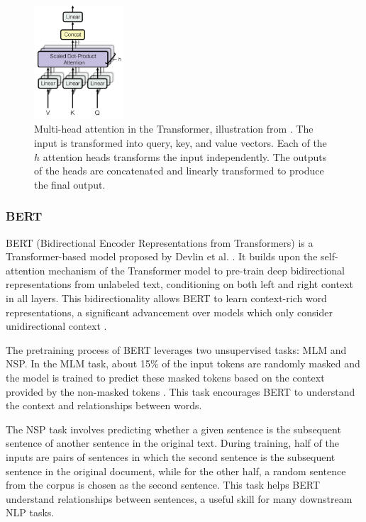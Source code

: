 \begin{figure}[ht]
    \centering
    \includegraphics[width=0.3\textwidth]{screenshots/multi_head_attention.png}
    \caption[Multi-Head Attention]{Multi-head attention in the Transformer, illustration from \cite{VaswaniAttentionAll2017}.
        The input is transformed into query, key, and value vectors. Each of the $h$ attention heads transforms the input independently. The outputs of the heads are concatenated and linearly transformed to produce the final output.}
    \label{fig:multi-head-attention}
\end{figure}


\subsubsection*{BERT}

BERT (Bidirectional Encoder Representations from Transformers) is a Transformer-based model proposed by Devlin et al. \cite{DevlinBERTPretraining2019}. It builds upon the self-attention mechanism of the Transformer model to pre-train deep bidirectional representations from unlabeled text, conditioning on both left and right context in all layers. This bidirectionality allows BERT to learn context-rich word representations, a significant advancement over models which only consider unidirectional context \cite{McCormickBERTWord2019,AlammarIllustratedBERT2018}.

The pretraining process of BERT leverages two unsupervised tasks: \ac{MLM} and \ac{NSP}. In the \ac{MLM} task, about 15\% of the input tokens are randomly masked and the model is trained to predict these masked tokens based on the context provided by the non-masked tokens \cite{DevlinBERTPretraining2019}. This task encourages BERT to understand the context and relationships between words.

The \ac{NSP} task involves predicting whether a given sentence is the subsequent sentence of another sentence in the original text. During training, half of the inputs are pairs of sentences in which the second sentence is the subsequent sentence in the original document, while for the other half, a random sentence from the corpus is chosen as the second sentence. This task helps BERT understand relationships between sentences, a useful skill for many downstream \ac{NLP} tasks.

